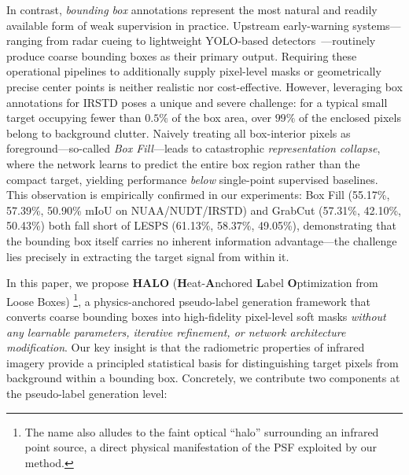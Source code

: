 In contrast, \emph{bounding box} annotations represent the most natural and readily
available form of weak supervision in practice.
Upstream early-warning systems---ranging from radar cueing to lightweight YOLO-based
detectors~\cite{yolo}---routinely produce coarse bounding boxes as their primary output.
Requiring these operational pipelines to additionally supply pixel-level masks or
geometrically precise center points is neither realistic nor cost-effective.
However, leveraging box annotations for IRSTD poses a unique and severe challenge:
for a typical small target occupying fewer than $0.5\%$ of the box area, over $99\%$
of the enclosed pixels belong to background clutter.
Naively treating all box-interior pixels as foreground---so-called \emph{Box Fill}---leads
to catastrophic \emph{representation collapse}, where the network learns to predict the
entire box region rather than the compact target, yielding performance \emph{below}
single-point supervised baselines.
This observation is empirically confirmed in our experiments: Box Fill (55.17\%,
57.39\%, 50.90\% mIoU on NUAA/NUDT/IRSTD) and GrabCut (57.31\%, 42.10\%, 50.43\%)
both fall short of LESPS (61.13\%, 58.37\%, 49.05\%), demonstrating that the bounding
box itself carries no inherent information advantage---the challenge lies precisely
in extracting the target signal from within it.

In this paper, we propose \textbf{HALO} (\textbf{H}eat-\textbf{A}nchored \textbf{L}abel
\textbf{O}ptimization from Loose Boxes)%
\footnote{The name also alludes to the faint optical ``halo'' surrounding an infrared
point source, a direct physical manifestation of the PSF exploited by our method.},
a physics-anchored pseudo-label generation framework that converts coarse bounding boxes
into high-fidelity pixel-level soft masks \emph{without any learnable parameters,
iterative refinement, or network architecture modification}.
Our key insight is that the radiometric properties of infrared imagery provide a
principled statistical basis for distinguishing target pixels from background within
a bounding box.
Concretely, we contribute two components at the pseudo-label generation level:

